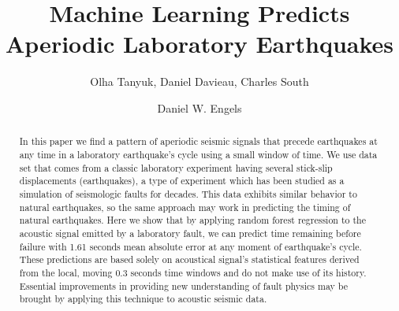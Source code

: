\documentclass[]{llncs} %
\begin{document}

\title{Machine Learning Predicts Aperiodic Laboratory Earthquakes}
\author{Olha Tanyuk, Daniel Davieau, Charles South \and Daniel W. Engels}


\maketitle
\begin{abstract}
In this paper we find a pattern of aperiodic seismic signals that precede earthquakes at any time in a laboratory earthquake’s cycle using a small window of time.  We use data set that comes from a classic laboratory experiment having several stick-slip displacements (earthquakes), a type of experiment which has been studied as a simulation of seismologic faults for decades. This data exhibits similar behavior to natural earthquakes, so the same approach may work in predicting the timing of natural earthquakes. Here we show that by applying random forest regression to the acoustic signal emitted by a laboratory fault, we can predict time remaining before failure with 1.61 seconds mean absolute error at any moment of earthquake’s cycle. These predictions are based solely on acoustical signal's statistical features derived from the local, moving 0.3 seconds time windows and do not make use of its history. Essential improvements in providing new understanding of fault physics may be brought by applying this technique to acoustic seismic data.\par
	

\end{abstract}
\end{document}

